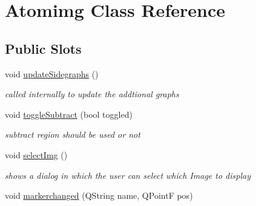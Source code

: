 \hypertarget{class_atomimg}{
\section{Atomimg Class Reference}
\label{class_atomimg}
}
\subsection*{Public Slots}
\begin{DoxyCompactItemize}
\item 
\hypertarget{class_atomimg_ac9a5377f8a98b3208e69b67c386d502d}{
void \hyperlink{class_atomimg_ac9a5377f8a98b3208e69b67c386d502d}{updateSidegraphs} ()}
\label{class_atomimg_ac9a5377f8a98b3208e69b67c386d502d}

\begin{DoxyCompactList}\small\item\em called internally to update the addtional graphs \item\end{DoxyCompactList}\item 
\hypertarget{class_atomimg_a4a04129c378e345e9cf6d4dc0e13be4c}{
void \hyperlink{class_atomimg_a4a04129c378e345e9cf6d4dc0e13be4c}{toggleSubtract} (bool toggled)}
\label{class_atomimg_a4a04129c378e345e9cf6d4dc0e13be4c}

\begin{DoxyCompactList}\small\item\em subtract region should be used or not \item\end{DoxyCompactList}\item 
void \hyperlink{class_atomimg_addae53a2d8a8f200fa769ca5f64ca0c8}{selectImg} ()
\begin{DoxyCompactList}\small\item\em shows a dialog in which the user can select which Image to display \item\end{DoxyCompactList}\item 
void \hyperlink{class_atomimg_ad72f49378bdc765051bd13bbfbaa5069}{markerchanged} (QString name, QPointF pos)
\end{DoxyCompactItemize}
